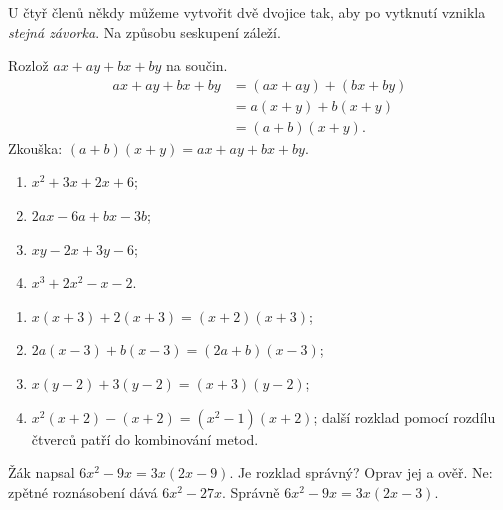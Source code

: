 \documentclass[11pt,a4paper]{article}
\begin{document}
U čtyř členů někdy můžeme vytvořit dvě dvojice tak, aby po vytknutí vznikla \emph{stejná závorka}. Na způsobu seskupení záleží.
\begin{prikladReseniBox}[breakable=false,title={Příklad 3}]
Rozlož $ax+ay+bx+by$ na součin.
\tcblower
\begin{align*}
ax+ay+bx+by&=(ax+ay)+(bx+by)\\
&=a(x+y)+b(x+y)\\
&=(a+b)(x+y).
\end{align*}
Zkouška: $(a+b)(x+y)=ax+ay+bx+by$.
\end{prikladReseniBox}
\begin{zadaniReseniBox}[breakable=false,title={Samostatná práce 2}]
\begin{enumerate}[label=\alph*)]
\item $x^2+3x+2x+6$;
\item $2ax-6a+bx-3b$;
\item $xy-2x+3y-6$;
\item $x^3+2x^2-x-2$.
\end{enumerate}
\tcblower
\begin{enumerate}[label=\alph*)]
\item $x(x+3)+2(x+3)=(x+2)(x+3)$;
\item $2a(x-3)+b(x-3)=(2a+b)(x-3)$;
\item $x(y-2)+3(y-2)=(x+3)(y-2)$;
\item $x^2(x+2)-(x+2)=(x^2-1)(x+2)$; další rozklad pomocí rozdílu čtverců patří do kombinování metod.
\end{enumerate}
\end{zadaniReseniBox}
\begin{zadaniReseniBox}[breakable=false,title={Rozšíření 1}]
Žák napsal $6x^2-9x=3x(2x-9)$. Je rozklad správný? Oprav jej a ověř.
\tcblower
Ne: zpětné roznásobení dává $6x^2-27x$. Správně $6x^2-9x=3x(2x-3)$.
\end{zadaniReseniBox}
\end{document}
